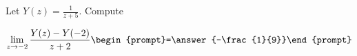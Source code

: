 \documentclass{ximera}
\author{Bart Snapp}
\begin{document}
\begin{exercise}
Let $Y(z) = \frac{1}{z+5}$. Compute

\[
\lim_{ z\to -2 } 
\frac{Y(z)-Y(-2)}{z+2} \begin{prompt}=\answer{-\frac{1}{9}}\end{prompt}
\]
\end{exercise}
\end{document}
